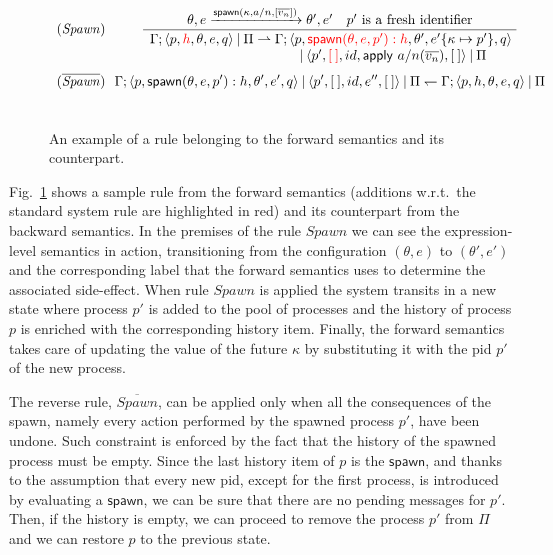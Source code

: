 \documentclass[runningheads]{llncs}
\newcommand{\arro}[1]{\xrightarrow{#1}}
\newcommand{\comp}{\:|\:}
\newcommand{\ms}[1]{\mathsf{#1}}
\newcommand{\lh}{\leftharpoondown}
\newcommand{\rh}{\rightharpoonup}
\newcommand{\red}[1]{\textcolor{red}{#1}}
\let\l=\langle
\let\r=\rangle
\def \tuple#1{\langle #1 \rangle}
\newcommand{\nill}{[\:]}
\begin{document}
\begin{figure}[t]
	$
	\begin{array}{r@{~~}c}
		
	(\mathit{Spawn}) & {\displaystyle
  	\frac{\theta,e \arro{\ms{spawn}(\kappa, a/n, [\overline{v_n}])}\theta',e'~~~p'\text{ is a fresh identifier}}
  	{\begin{array}{l@{~}l}
   	\Gamma; \tuple{p, \red{h}, \theta, e, q} \comp \Pi \rh \Gamma; \tuple{p, \red{\ms{spawn}(\theta,e, p'): h}, \theta',e'\{\kappa \mapsto p'\}, q}\\
  	  \hspace{25ex}\comp \tuple{p', \red{\nill}, id,\ms{apply}~a/n (\overline{v_n}), \nill } \comp \Pi
  	\end{array}
  	}}\\[6ex]
  
		
	(\mathit{\overline{Spawn}}) & {\displaystyle
    \Gamma; \l p, \ms{spawn}(\theta,e,p'):h,\theta',e',q \r \comp \l p', \nill, id,e'',\nill \r \comp \Pi 
  	\lh
  	\Gamma; \l p, h,\theta,e,q \r \comp \Pi} \\[4ex] 
  	
	\end{array}
	$
	\caption{An example of a rule belonging to the forward semantics and its counterpart.}
	\label{fig:rev-sem}
\end{figure}


Fig.~\ref{fig:rev-sem} shows a sample rule from the forward semantics (additions w.r.t.~the standard system rule are highlighted in red) and its counterpart from the backward semantics. In the premises of the rule $Spawn$ we can see the expression-level semantics in action, transitioning from the configuration $(\theta, e)$ to $(\theta', e')$ and the corresponding label that the forward semantics uses to determine the associated side-effect. When rule $Spawn$ is applied the system transits in a new state where process $p'$ is added to the pool of processes and the history of process $p$ is enriched with the corresponding history item. Finally, the forward semantics takes care of updating the value of the future $\kappa$ by substituting it with the pid $p'$ of the new process.

The reverse rule, $\overline{Spawn}$, can be applied only when all the consequences of the spawn, namely every action performed by the spawned process $p'$, have been undone.
Such constraint is enforced by the fact that the history of the spawned process must be empty.
Since the last history item of $p$ is the $\ms{spawn}$, and thanks to the assumption that every new pid, except for the first process, is introduced by evaluating a $\ms{spawn}$, we can be sure that there are no pending messages for $p'$. Then, if the history is empty, we can proceed to remove the process $p'$ from $\Pi$ and we can restore $p$ to the previous state.
\end{document}
